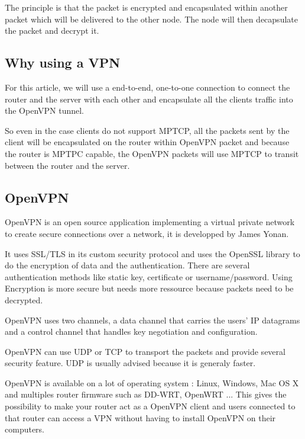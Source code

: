   The principle is that the packet is encrypted and encapsulated within another packet which will be delivered to the other node. The node will then decapsulate the packet and decrypt it.

  \subsection{Why using a VPN}

  For this article, we will use a end-to-end, one-to-one connection to connect the router and the server with each other and encapsulate all the clients traffic into the OpenVPN tunnel.

  So even in the case clients do not support MPTCP, all the packets sent by the client will be encapsulated on the router within OpenVPN packet
  and because the router is MPTPC capable, the OpenVPN packets will use MPTCP to transit between the router and the server.

  \subsection{OpenVPN} \label{sec:section_openvpn}

  OpenVPN is an open source application implementing a virtual private network to create secure connections over a network, it is developped by James Yonan.

  It uses SSL/TLS in its custom security protocol and uses the OpenSSL library to do the encryption of data and the authentication.
  There are several authentication methods like static key, certificate or username/password.
  Using Encryption is more secure but needs more ressource because packets need to be decrypted.

  OpenVPN uses two channels, a data channel that carries the users' IP datagrams and a control channel that handles key negotiation and configuration.

  OpenVPN can use UDP or TCP to transport the packets and provide several security feature. UDP is usually advised because it is generaly faster.

  OpenVPN is available on a lot of operating system : Linux, Windows, Mac OS X and multiples router firmware such as DD-WRT, OpenWRT ...
  This gives the possibility to make your router act as a OpenVPN client and users connected to that router can access a VPN without having to install OpenVPN on their computers.

